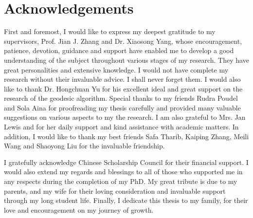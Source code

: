 \chapter*{Acknowledgements}


First and foremost, I would like to express my deepest gratitude to my supervisors, Prof. Jian J. Zhang and Dr. Xiaosong Yang, whose encouragement, patience, devotion, guidance and support have enabled me to develop a good 
understanding of the subject throughout various stages of my research. They have great personalities and extensive knowledge. I would not have complete my research without their invaluable advice. I shall never forget them. I would also like to thank Dr. Hongchuan Yu for his excellent ideal and great support on the research of the geodesic algorithm. Special thanks to my friends Rudra Poudel and Sola Aina for proofreading my thesis carefully and provided many valuable suggestions on various aspects to my the research. I am also grateful to Mrs. Jan Lewis and for her daily support and kind assistance with academic matters. In addition, I would like to thank my best friends Safa Tharib, Kaiping Zhang, Meili Wang and Shaoyong Liu for the invaluable friendship.  

I gratefully acknowledge Chinese Scholarship Council for their financial support. I would also extend my regards and blessings to all of those who supported me in any respects during the completion of my PhD. My great tribute is due to my parents, and my wife for their loving consideration and invaluable support through my long student life. Finally, I dedicate this thesis to my family, for their love and encouragement on my journey of growth. 
